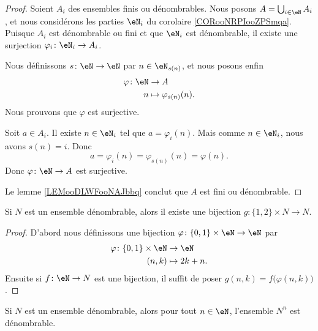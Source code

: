 \begin{proof}
	Soient \( A_i\) des ensembles finis ou dénombrables. Nous posons \( A=\bigcup_{i\in \eN}A_i\), et nous considérons les parties \( \eN_i\) du corolaire \ref{CORooNRPIooZPSmqa}. Puisque \( A_i\) est dénombrable ou fini et que \( \eN_i\) est dénombrable, il existe une surjection \( \varphi_i\colon \eN_i\to A_i\).

	Nous définissons \( s\colon \eN\to \eN\) par \( n\in \eN_{s(n)}\), et nous posons enfin
	\begin{equation}
		\begin{aligned}
			\varphi\colon \eN & \to A                      \\
			n                 & \mapsto \varphi_{s(n)}(n).
		\end{aligned}
	\end{equation}
	Nous prouvons que \( \varphi\) est surjective.

	Soit \( a\in A_i\). Il existe \( n\in \eN_i\) tel que \( a=\varphi_i(n)\). Mais comme \( n\in \eN_i\), nous avons \( s(n)=i\). Donc
	\begin{equation}
		a=\varphi_i(n)=\varphi_{s(n)}(n)=\varphi(n).
	\end{equation}
	Donc \( \varphi\colon \eN\to A\) est surjective.

	Le lemme \ref{LEMooDLWFooNAJbbq} conclut que \( A\) est fini ou dénombrable.
\end{proof}

\begin{lemma}        \label{LEMooRXSRooBUWOyb}
	Si \( N\) est un ensemble dénombrable, alors il existe une bijection \( g\colon \{ 1,2 \}\times N\to N\).
\end{lemma}

\begin{proof}
	D'abord nous définissons une bijection \( \varphi\colon \{ 0,1 \}\times \eN\to \eN\) par
	\begin{equation}
		\begin{aligned}
			\varphi\colon \{ 0,1 \}\times \eN & \to \eN       \\
			(n,k)                             & \mapsto 2k+n.
		\end{aligned}
	\end{equation}
	Ensuite si \( f\colon \eN\to N\) est une bijection, il suffit de poser \( g(n,k)=f\big( \varphi(n,k) \big)\).
\end{proof}

\begin{proposition}     \label{PROPooDMZHooXouDrQ}
	Si \( N\) est un ensemble dénombrable, alors pour tout \( n\in \eN\), l'ensemble \( N^n\) est dénombrable.
\end{proposition}


